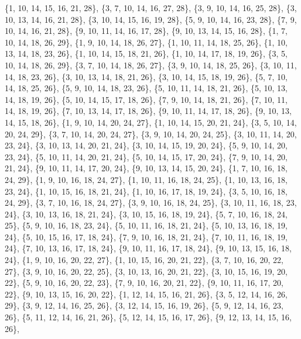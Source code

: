 \documentclass[11pt,a4paper]{article}
\begin{document}
{\{1, 10, 14, 15, 16, 21, 28\}, \{3, 7, 10, 14, 16, 27, 28\}, \{3, 9, 10, 14, 16, 25, 28\}, \{3, 10, 13, 14, 16, 21, 28\}, \{3, 10, 14, 15, 16, 19, 28\},
\{5, 9, 10, 14, 16, 23, 28\}, \{7, 9, 10, 14, 16, 21, 28\}, \{9, 10, 11, 14, 16, 17, 28\}, \{9, 10, 13, 14, 15, 16, 28\}, \{1, 7, 10, 14, 18, 26, 29\},
\{1, 9, 10, 14, 18, 26, 27\}, \{1, 10, 11, 14, 18, 25, 26\}, \{1, 10, 13, 14, 18, 23, 26\}, \{1, 10, 14, 15, 18, 21, 26\}, \{1, 10, 14, 17, 18, 19, 26\},
\{3, 5, 10, 14, 18, 26, 29\}, \{3, 7, 10, 14, 18, 26, 27\}, \{3, 9, 10, 14, 18, 25, 26\}, \{3, 10, 11, 14, 18, 23, 26\}, \{3, 10, 13, 14, 18, 21, 26\},
\{3, 10, 14, 15, 18, 19, 26\}, \{5, 7, 10, 14, 18, 25, 26\}, \{5, 9, 10, 14, 18, 23, 26\}, \{5, 10, 11, 14, 18, 21, 26\}, \{5, 10, 13, 14, 18, 19, 26\},
\{5, 10, 14, 15, 17, 18, 26\}, \{7, 9, 10, 14, 18, 21, 26\}, \{7, 10, 11, 14, 18, 19, 26\}, \{7, 10, 13, 14, 17, 18, 26\}, \{9, 10, 11, 14, 17, 18, 26\},
\{9, 10, 13, 14, 15, 18, 26\}, \{1, 9, 10, 14, 20, 24, 27\}, \{1, 10, 14, 15, 20, 21, 24\}, \{3, 5, 10, 14, 20, 24, 29\}, \{3, 7, 10, 14, 20, 24, 27\},
\{3, 9, 10, 14, 20, 24, 25\}, \{3, 10, 11, 14, 20, 23, 24\}, \{3, 10, 13, 14, 20, 21, 24\}, \{3, 10, 14, 15, 19, 20, 24\}, \{5, 9, 10, 14, 20, 23, 24\},
\{5, 10, 11, 14, 20, 21, 24\}, \{5, 10, 14, 15, 17, 20, 24\}, \{7, 9, 10, 14, 20, 21, 24\}, \{9, 10, 11, 14, 17, 20, 24\}, \{9, 10, 13, 14, 15, 20, 24\},
\{1, 7, 10, 16, 18, 24, 29\}, \{1, 9, 10, 16, 18, 24, 27\}, \{1, 10, 11, 16, 18, 24, 25\}, \{1, 10, 13, 16, 18, 23, 24\}, \{1, 10, 15, 16, 18, 21, 24\},
\{1, 10, 16, 17, 18, 19, 24\}, \{3, 5, 10, 16, 18, 24, 29\}, \{3, 7, 10, 16, 18, 24, 27\}, \{3, 9, 10, 16, 18, 24, 25\}, \{3, 10, 11, 16, 18, 23, 24\},
\{3, 10, 13, 16, 18, 21, 24\}, \{3, 10, 15, 16, 18, 19, 24\}, \{5, 7, 10, 16, 18, 24, 25\}, \{5, 9, 10, 16, 18, 23, 24\}, \{5, 10, 11, 16, 18, 21, 24\},
\{5, 10, 13, 16, 18, 19, 24\}, \{5, 10, 15, 16, 17, 18, 24\}, \{7, 9, 10, 16, 18, 21, 24\}, \{7, 10, 11, 16, 18, 19, 24\}, \{7, 10, 13, 16, 17, 18, 24\},
\{9, 10, 11, 16, 17, 18, 24\}, \{9, 10, 13, 15, 16, 18, 24\}, \{1, 9, 10, 16, 20, 22, 27\}, \{1, 10, 15, 16, 20, 21, 22\}, \{3, 7, 10, 16, 20, 22, 27\},
\{3, 9, 10, 16, 20, 22, 25\}, \{3, 10, 13, 16, 20, 21, 22\}, \{3, 10, 15, 16, 19, 20, 22\}, \{5, 9, 10, 16, 20, 22, 23\}, \{7, 9, 10, 16, 20, 21, 22\},
\{9, 10, 11, 16, 17, 20, 22\}, \{9, 10, 13, 15, 16, 20, 22\}, \{1, 12, 14, 15, 16, 21, 26\}, \{3, 5, 12, 14, 16, 26, 29\}, \{3, 9, 12, 14, 16, 25, 26\},
\{3, 12, 14, 15, 16, 19, 26\}, \{5, 9, 12, 14, 16, 23, 26\}, \{5, 11, 12, 14, 16, 21, 26\}, \{5, 12, 14, 15, 16, 17, 26\}, \{9, 12, 13, 14, 15, 16, 26\},
}
\end{document}
